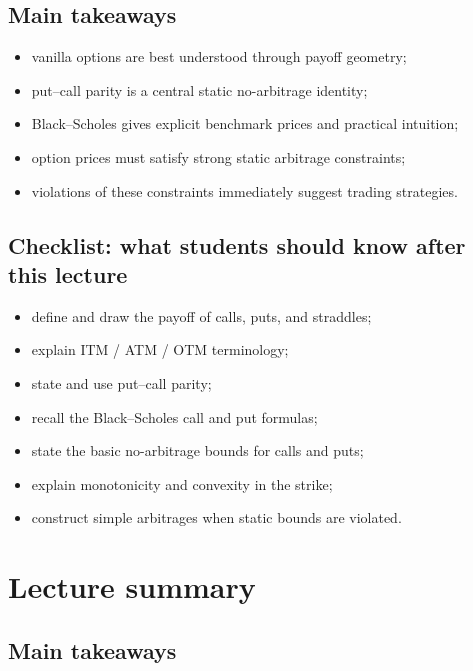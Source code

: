 \documentclass[11pt]{article}
\newcommand{\1}{\mathbf{1}}
\theoremstyle{plain}
\theoremstyle{definition}
\theoremstyle{remark}
\begin{document}
\subsection{Main takeaways}
\begin{itemize}[leftmargin=1.4em]
    \item vanilla options are best understood through payoff geometry;
    \item put--call parity is a central static no-arbitrage identity;
    \item Black--Scholes gives explicit benchmark prices and practical intuition;
    \item option prices must satisfy strong static arbitrage constraints;
    \item violations of these constraints immediately suggest trading strategies.
\end{itemize}

\subsection{Checklist: what students should know after this lecture}
\begin{itemize}[leftmargin=1.4em]
    \item define and draw the payoff of calls, puts, and straddles;
    \item explain ITM / ATM / OTM terminology;
    \item state and use put--call parity;
    \item recall the Black--Scholes call and put formulas;
    \item state the basic no-arbitrage bounds for calls and puts;
    \item explain monotonicity and convexity in the strike;
    \item construct simple arbitrages when static bounds are violated.
\end{itemize}

\section{Lecture summary}

\subsection{Main takeaways}
\end{document}
